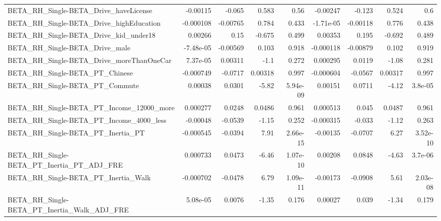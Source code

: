 \begin{tabular}{lrrrrrrrr}
BETA\_RH\_Single-BETA\_Drive\_haveLicense              &    -0.00115 &       -0.065 &    0.583 &     0.56 &   -0.00247 &      -0.123 &        0.524 &           0.6 \\
BETA\_RH\_Single-BETA\_Drive\_highEducation            &   -0.000108 &     -0.00765 &    0.784 &    0.433 &  -1.71e-05 &    -0.00118 &        0.776 &         0.438 \\
BETA\_RH\_Single-BETA\_Drive\_kid\_under18              &     0.00266 &         0.15 &   -0.675 &    0.499 &    0.00353 &       0.195 &       -0.692 &         0.489 \\
BETA\_RH\_Single-BETA\_Drive\_male                     &   -7.48e-05 &     -0.00569 &    0.103 &    0.918 &  -0.000118 &    -0.00879 &        0.102 &         0.919 \\
BETA\_RH\_Single-BETA\_Drive\_moreThanOneCar           &    7.37e-05 &      0.00311 &     -1.1 &    0.272 &   0.000295 &      0.0119 &        -1.08 &         0.281 \\
BETA\_RH\_Single-BETA\_PT\_Chinese                     &   -0.000749 &      -0.0717 &  0.00318 &    0.997 &  -0.000604 &     -0.0567 &      0.00317 &         0.997 \\
BETA\_RH\_Single-BETA\_PT\_Commute                     &     0.00038 &       0.0301 &    -5.82 & 5.94e-09 &    0.00151 &      0.0711 &        -4.12 &       3.8e-05 \\
BETA\_RH\_Single-BETA\_PT\_Income\_12000\_more           &    0.000277 &       0.0248 &   0.0486 &    0.961 &   0.000513 &       0.045 &       0.0487 &         0.961 \\
BETA\_RH\_Single-BETA\_PT\_Income\_4000\_less            &    -0.00048 &      -0.0539 &    -1.15 &    0.252 &  -0.000315 &      -0.033 &        -1.12 &         0.263 \\
BETA\_RH\_Single-BETA\_PT\_Inertia\_PT                  &   -0.000545 &      -0.0394 &     7.91 & 2.66e-15 &   -0.00135 &     -0.0707 &         6.27 &      3.52e-10 \\
BETA\_RH\_Single-BETA\_PT\_Inertia\_PT\_ADJ\_FRE          &    0.000733 &       0.0473 &    -6.46 & 1.07e-10 &    0.00208 &      0.0848 &        -4.63 &       3.7e-06 \\
BETA\_RH\_Single-BETA\_PT\_Inertia\_Walk                &   -0.000702 &      -0.0478 &     6.79 & 1.09e-11 &   -0.00173 &     -0.0908 &         5.61 &      2.03e-08 \\
BETA\_RH\_Single-BETA\_PT\_Inertia\_Walk\_ADJ\_FRE        &    5.08e-05 &       0.0076 &    -1.35 &    0.176 &    0.00027 &       0.039 &        -1.34 &         0.179 \\

\end{tabular}

